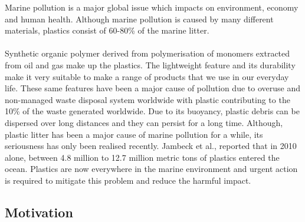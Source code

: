 \documentclass[10pt]{article}\usepackage[]{graphicx}\usepackage[]{color}
\begin{document}
Marine pollution is a major global issue which impacts on environment, economy and human health. Although marine pollution is caused by many different materials, plastics consist of 60-80\% of the marine litter.\cite{DERRAIK2002} \cite{REISSER2013} \cite{BARBOZA2020}
\\
\\
Synthetic organic polymer derived from polymerisation of monomers extracted from oil and gas make up the plastics.\cite{DERRAIK2002} \cite{RIOS2007} The lightweight feature and its durability make it very suitable to make a range of products that we use in our everyday life.\cite{BARNES2009} \cite{SIVAN2011} These same features have been a major cause of pollution due to overuse and non-managed waste disposal system worldwide with plastic contributing to the 10\% of the waste generated worldwide.\cite{BARNES2009} Due to its buoyancy, plastic debris can be dispersed over long distances and they can persist for a long time. Although, plastic litter has been a major cause of marine pollution for a while, its seriousness has only been realised recently. Jambeck et al.,\cite{JAMBECK2015} reported that in 2010 alone, between 4.8 million to 12.7 million metric tons of plastics entered the ocean. Plastics are now everywhere in the marine environment and urgent action is required to mitigate this problem and reduce the harmful impact.\cite{RIOS2007} \cite{ROCHMAN2015}



\subsection{Motivation}\label{mot}
\end{document}
